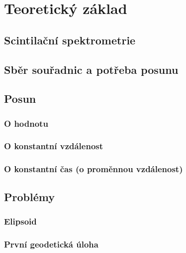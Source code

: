 \chapter{Teoretický základ}
\label{2-teorie}



\section{Scintilační spektrometrie}
\label{spektrometrie}



\section{Sběr souřadnic a potřeba posunu}
\label{potreba posunu}




\section{Posun}
\label{posun}

\subsection{O hodnotu}
\label{by_points}


\subsection{O konstantní vzdálenost}
\label{by_distance}


\subsection{O konstantní čas (o proměnnou vzdálenost)}
\label{by_seconds}


\section{Problémy}
\label{problemy}

\subsection{Elipsoid}
\label{elipsoid}


\subsection{První geodetická úloha}
\label{prvnigu}


